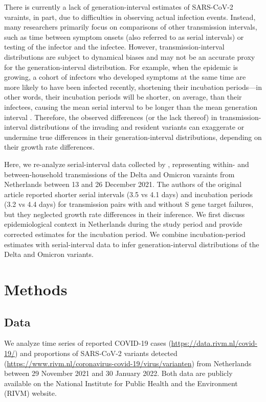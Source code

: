 \documentclass[12pt]{article}
\begin{document}
There is currently a lack of generation-interval estimates of SARS-CoV-2 varaints, in part, due to difficulties in observing actual infection events.
Instead, many researchers primarily focus on comparisons of other transmission intervals, such as time between symptom onsets (also referred to as serial intervals) or testing \citep{abbott2022test} of the infector and the infectee.
However, transmission-interval distributions are subject to dynamical biases and may not be an accurate proxy for the generation-interval distribution.
For example, when the epidemic is growing, a cohort of infectors who developed symptoms at the same time are more likely to have been infected recently, shortening their incubation periods---in other words, their incubation periods will be shorter, on average, than their infectees, causing the mean serial interval to be longer than the mean generation interval \citep{park2021forward}.
Therefore, the observed differences (or the lack thereof) in transmission-interval distributions of the invading and resident variants can exaggerate or undermine true differences in their generation-interval distributions, depending on their growth rate differences.

Here, we re-analyze serial-interval data collected by \citep{backer2021omicron}, representing within- and between-household transmissions of the Delta and Omicron varaints from Netherlands between 13 and 26 December 2021.
The authors of the original article reported shorter serial intervals (3.5 vs 4.1 days) and incubation periods (3.2 vs 4.4 days) for transmission pairs with and without S gene target failures, but they neglected growth rate differences in their inference.
We first discuss epidemiological context in Netherlands during the study period and provide corrected estimates for the incubation period.
We combine incubation-period estimates with serial-interval data to infer generation-interval distributions of the Delta and Omicron variants.

\section{Methods}

\subsection{Data}

We analyze time series of reported COVID-19 cases (\url{https://data.rivm.nl/covid-19/}) and proportions of SARS-CoV-2 variants detected (\url{https://www.rivm.nl/coronavirus-covid-19/virus/varianten}) from Netherlands between 29 November 2021 and 30 January 2022.
Both data are publicly available on the National Institute for Public Health and the Environment (RIVM) website.
\end{document}

